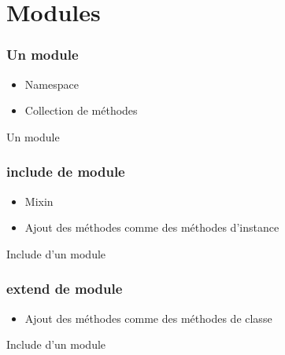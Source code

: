 \documentclass{beamer}
\begin{document}
\section{Modules}

\begin{frame}
  \frametitle{Un module}
  \begin{itemize}
    \item Namespace
    \item Collection de m\'ethodes
  \end{itemize}
\end{frame}

\begin{frame}
  \begin{beamerboxesrounded}{Un module}
    
  \end{beamerboxesrounded}
\end{frame}

\begin{frame}
  \frametitle{include de module}
  \begin{itemize}
    \item Mixin
    \item Ajout des m\'ethodes comme des m\'ethodes d'instance
  \end{itemize}
\end{frame}

\begin{frame}
  \begin{beamerboxesrounded}{Include d'un module}
    
  \end{beamerboxesrounded}
\end{frame}

\begin{frame}
  \frametitle{extend de module}
  \begin{itemize}
    \item Ajout des m\'ethodes comme des m\'ethodes de classe
  \end{itemize}
\end{frame}

\begin{frame}
  \begin{beamerboxesrounded}{Include d'un module}
    
  \end{beamerboxesrounded}
\end{frame}
\end{document}
